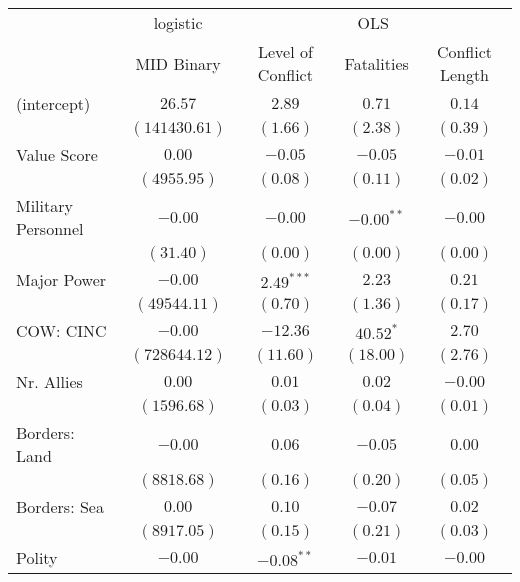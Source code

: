 
\begin{table}
\begin{center}
\begin{tabular}{l c c c c}
\toprule
 & \multicolumn{1}{c}{logistic} & \multicolumn{3}{c}{OLS} \\
\cmidrule(lr){2-2} \cmidrule(lr){3-5}
 & MID Binary & Level of Conflict & Fatalities & Conflict Length \\
\midrule
(intercept)                & $26.57$       & $2.89$       & $0.71$       & $0.14$   \\
                           & $(141430.61)$ & $(1.66)$     & $(2.38)$     & $(0.39)$ \\
Value Score                & $0.00$        & $-0.05$      & $-0.05$      & $-0.01$  \\
                           & $(4955.95)$   & $(0.08)$     & $(0.11)$     & $(0.02)$ \\
Military Personnel         & $-0.00$       & $-0.00$      & $-0.00^{**}$ & $-0.00$  \\
                           & $(31.40)$     & $(0.00)$     & $(0.00)$     & $(0.00)$ \\
Major Power                & $-0.00$       & $2.49^{***}$ & $2.23$       & $0.21$   \\
                           & $(49544.11)$  & $(0.70)$     & $(1.36)$     & $(0.17)$ \\
COW: CINC                  & $-0.00$       & $-12.36$     & $40.52^{*}$  & $2.70$   \\
                           & $(728644.12)$ & $(11.60)$    & $(18.00)$    & $(2.76)$ \\
Nr. Allies                 & $0.00$        & $0.01$       & $0.02$       & $-0.00$  \\
                           & $(1596.68)$   & $(0.03)$     & $(0.04)$     & $(0.01)$ \\
Borders: Land              & $-0.00$       & $0.06$       & $-0.05$      & $0.00$   \\
                           & $(8818.68)$   & $(0.16)$     & $(0.20)$     & $(0.05)$ \\
Borders: Sea               & $0.00$        & $0.10$       & $-0.07$      & $0.02$   \\
                           & $(8917.05)$   & $(0.15)$     & $(0.21)$     & $(0.03)$ \\
Polity                     & $-0.00$       & $-0.08^{**}$ & $-0.01$      & $-0.00$  \\

\end{tabular}
\end{center}
\end{table}
